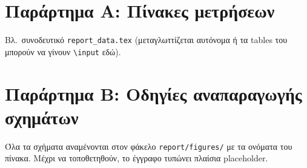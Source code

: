 \documentclass[11pt]{article}
\newcommand{\code}[1]{\texttt{#1}}
\begin{document}
\appendix
\section{Παράρτημα Α: Πίνακες μετρήσεων}
Βλ.\ συνοδευτικό \code{report\_data.tex} (μεταγλωττίζεται αυτόνομα ή τα
tables του μπορούν να γίνουν \code{\textbackslash input} εδώ).

\section{Παράρτημα Β: Οδηγίες αναπαραγωγής σχημάτων}\label{app:figs}

Όλα τα σχήματα αναμένονται στον φάκελο \code{report/figures/} με τα
ονόματα του πίνακα. Μέχρι να τοποθετηθούν, το έγγραφο τυπώνει πλαίσια
placeholder.
\end{document}
